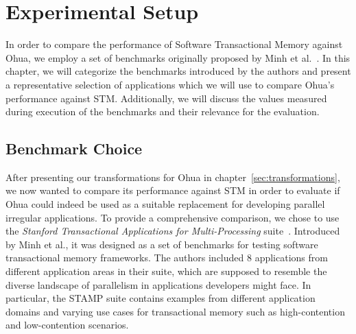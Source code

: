 %
\chapter{Experimental Setup}%
\label{sec:experiments}

In order to compare the performance of Software Transactional Memory against Ohua, we employ a set of benchmarks originally proposed by Minh et al.~\cite{minh2008stamp}.
In this chapter, we will categorize the benchmarks introduced by the authors and present a representative selection of applications which we will use to compare Ohua's performance against STM.
Additionally, we will discuss the values measured during execution of the benchmarks and their relevance for the evaluation.

\section{Benchmark Choice}
\label{sec:experiments:choice}

After presenting our transformations for Ohua in chapter~\ref{sec:transformations}, we now wanted to compare its performance against STM in order to evaluate if Ohua could indeed be used as a suitable replacement for developing parallel irregular applications.
To provide a comprehensive comparison, we chose to use the \emph{Stanford Transactional Applications for Multi-Processing} suite~\cite{minh2008stamp}.
Introduced by Minh et al., it was designed as a set of benchmarks for testing software transactional memory frameworks.
The authors included 8 applications from different application areas in their suite, which are supposed to resemble the diverse landscape of parallelism in applications developers might face.
In particular, the STAMP suite contains examples from different application domains and varying use cases for transactional memory such as high-contention and low-contention scenarios.

